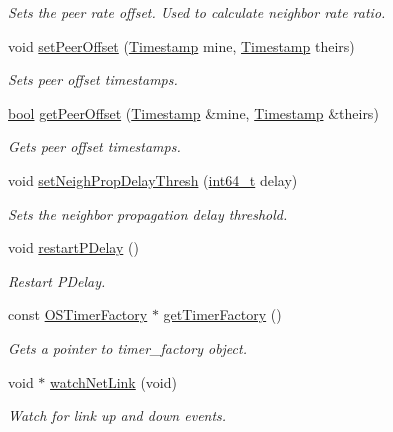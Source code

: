 \begin{DoxyCompactItemize}
\begin{DoxyCompactList}\small\item\em Sets the peer rate offset. Used to calculate neighbor rate ratio. \end{DoxyCompactList}\item 
void \hyperlink{class_common_port_abdabe6c9152a3b381be89ac7c5b9c637}{set\+Peer\+Offset} (\hyperlink{class_timestamp}{Timestamp} mine, \hyperlink{class_timestamp}{Timestamp} theirs)
\begin{DoxyCompactList}\small\item\em Sets peer offset timestamps. \end{DoxyCompactList}\item 
\hyperlink{avb__gptp_8h_af6a258d8f3ee5206d682d799316314b1}{bool} \hyperlink{class_common_port_a2b43f12b4cc170a355a13691c6ef7c78}{get\+Peer\+Offset} (\hyperlink{class_timestamp}{Timestamp} \&mine, \hyperlink{class_timestamp}{Timestamp} \&theirs)
\begin{DoxyCompactList}\small\item\em Gets peer offset timestamps. \end{DoxyCompactList}\item 
void \hyperlink{class_common_port_af7e96b880eccf3d6a1bf962a7d2ca296}{set\+Neigh\+Prop\+Delay\+Thresh} (\hyperlink{parse_8c_a67a9885ef4908cb72ce26d75b694386c}{int64\+\_\+t} delay)
\begin{DoxyCompactList}\small\item\em Sets the neighbor propagation delay threshold. \end{DoxyCompactList}\item 
void \hyperlink{class_common_port_a29bef5d949dfdf7cf0a38855eeb2edb9}{restart\+P\+Delay} ()
\begin{DoxyCompactList}\small\item\em Restart P\+Delay. \end{DoxyCompactList}\item 
const \hyperlink{class_o_s_timer_factory}{O\+S\+Timer\+Factory} $\ast$ \hyperlink{class_common_port_ae659108ab426a2d9e8e3c84b63ac6cdc}{get\+Timer\+Factory} ()
\begin{DoxyCompactList}\small\item\em Gets a pointer to timer\+\_\+factory object. \end{DoxyCompactList}\item 
void $\ast$ \hyperlink{class_common_port_a7fc2ad2925376becd473fcfc684472fb}{watch\+Net\+Link} (void)
\begin{DoxyCompactList}\small\item\em Watch for link up and down events. \end{DoxyCompactList}\item 

\end{DoxyCompactItemize}
